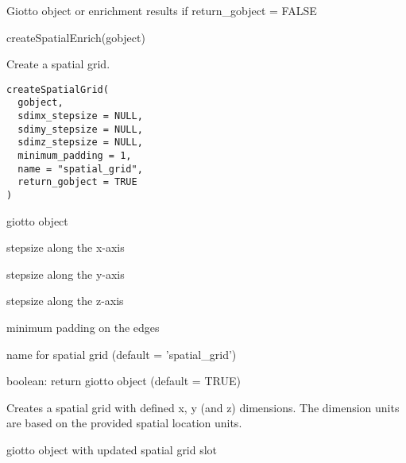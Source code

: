 \documentclass[a4paper]{book}
\begin{document}
%
\begin{Value}
Giotto object or enrichment results if return\_gobject = FALSE
\end{Value}
%
\begin{Examples}
\begin{ExampleCode}
    createSpatialEnrich(gobject)
\end{ExampleCode}
\end{Examples}
%
\begin{Description}\relax
Create a spatial grid.
\end{Description}
%
\begin{Usage}
\begin{verbatim}
createSpatialGrid(
  gobject,
  sdimx_stepsize = NULL,
  sdimy_stepsize = NULL,
  sdimz_stepsize = NULL,
  minimum_padding = 1,
  name = "spatial_grid",
  return_gobject = TRUE
)
\end{verbatim}
\end{Usage}
%
\begin{Arguments}
\begin{ldescription}
\item[\code{gobject}] giotto object

\item[\code{sdimx\_stepsize}] stepsize along the x-axis

\item[\code{sdimy\_stepsize}] stepsize along the y-axis

\item[\code{sdimz\_stepsize}] stepsize along the z-axis

\item[\code{minimum\_padding}] minimum padding on the edges

\item[\code{name}] name for spatial grid (default = 'spatial\_grid')

\item[\code{return\_gobject}] boolean: return giotto object (default = TRUE)
\end{ldescription}
\end{Arguments}
%
\begin{Details}\relax
Creates a spatial grid with defined x, y (and z) dimensions.
The dimension units are based on the provided spatial location units.
\end{Details}
%
\begin{Value}
giotto object with updated spatial grid slot
\end{Value}
\end{document}

